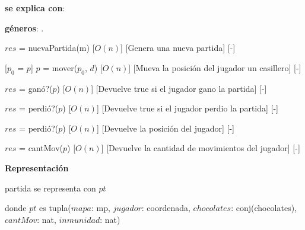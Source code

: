 \documentclass{book}
\begin{document}
    \begin{Interfaz}

        \textbf{se explica con}: 

        \textbf{géneros}: .


            {$res$ = nuevaPartida(m)}%
            [$O(n)$]
            [Genera una nueva partida]
            [-]

            [$p_0$ = $p$]
            {$p$ = mover($p_0$, $d$)}%
            [$O(n)$]
            [Mueva la posición del jugador un casillero]
            [-]

            {$res$ = ganó?($p$)}%
            [$O(n)$]
            [Devuelve true si el jugador gano la partida]
            [-]

            {$res$ = perdió?($p$)}%
            [$O(n)$]
            [Devuelve true si el jugador perdio la partida]
            [-]

            {$res$ = perdió?($p$)}%
            [$O(n)$]
            [Devuelve la posición del jugador]
            [-]

            {$res$ = cantMov($p$)}%
            [$O(n)$]
            [Devuelve la cantidad de movimientos del jugador]
            [-]

    \end{Interfaz}

    \textbf{Representación}

    partida se representa con $pt$

    donde $pt$ es tupla($mapa$: mp, $jugador$: coordenada, $chocolates$: conj(chocolates), $cantMov$: nat, $inmunidad$: nat)

    \newpage
\end{document}
